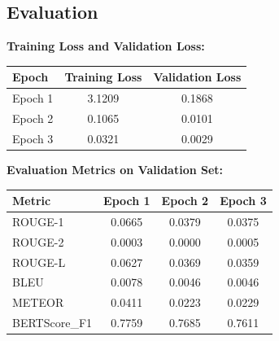 \documentclass{article}
\begin{document}
\subsection{Evaluation}
\textbf{Training Loss and Validation Loss:}\\[5mm]
\begin{tabular}{lcc}
\toprule
\textbf{Epoch} & \textbf{Training Loss} & \textbf{Validation Loss} \\
\midrule
Epoch 1 & 3.1209 & 0.1868 \\
Epoch 2 & 0.1065 & 0.0101 \\
Epoch 3 & 0.0321 & 0.0029 \\
\bottomrule
\end{tabular}

\vspace{5mm}
\textbf{Evaluation Metrics on Validation Set:}\\[5mm]
\begin{tabular}{lccc}
\toprule
\textbf{Metric}    & \textbf{Epoch 1} & \textbf{Epoch 2} & \textbf{Epoch 3} \\
\midrule
ROUGE-1          & 0.0665         & 0.0379         & 0.0375         \\
ROUGE-2          & 0.0003         & 0.0000         & 0.0005         \\
ROUGE-L          & 0.0627         & 0.0369         & 0.0359         \\
BLEU             & 0.0078         & 0.0046         & 0.0046         \\
METEOR           & 0.0411         & 0.0223         & 0.0229         \\
BERTScore\_F1    & 0.7759         & 0.7685         & 0.7611         \\
\bottomrule
\end{tabular}
\end{document}
